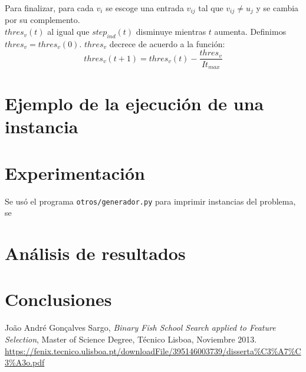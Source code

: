 \documentclass[12pt]{article}
\begin{document}
Para finalizar, para cada $v_i$ se escoge una entrada $v_{ij}$ tal que $v_{ij} \neq u_j$ y se cambia por su complemento. \\

$thres_v(t)$ al igual que $step_{ind}(t)$ disminuye mientras $t$ aumenta. Definimos $thres_v = thres_v(0)$. $thres_v$ decrece de acuerdo a la función:
\begin{equation*}
  thres_v(t + 1) = thres_v(t) - \frac{thres_v}{It_{max}}
\end{equation*}

\section{Ejemplo de la ejecución de una instancia}

\section{Experimentación}

Se usó el programa \texttt{otros/generador.py} para imprimir instancias del problema, se 

\section{Análisis de resultados}

\section{Conclusiones}

\begin{thebibliography}{99}

  João André Gonçalves Sargo,
  \emph{Binary Fish School Search applied to Feature Selection},
  Master of Science Degree, Técnico Lisboa,
  Noviembre 2013. \\
  \url{https://fenix.tecnico.ulisboa.pt/downloadFile/395146003739/disserta%C3%A7%C3%A3o.pdf}
  \end{thebibliography}
\end{document}
